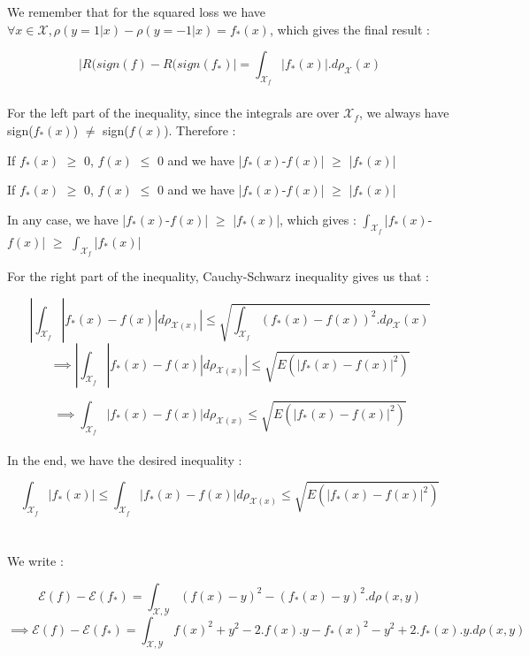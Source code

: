 \documentclass[final,3p,times,12pt]{article}
\begin{document}
We remember that for the squared loss we have $\forall x \in \mathcal{X}, \rho(y=1|x) - \rho(y=-1|x) = f_*(x)$, which gives the final result : 

\[
|R(sign(f) - R(sign(f_*)| = \int_{\mathcal{X}_f} |f_*(x)|. d\rho_{\mathcal{X}}(x)
\]

\subsubsection{}

For the left part of the inequality, since the integrals are over $\mathcal{X}_f$, we always have sign($f_*(x)$) $\neq$ sign($f(x)$). Therefore :

If $f_*(x)$ $\geq$ 0, $f(x)$ $\leq$ 0 and we have |$f_*(x)$-$f(x)$| $\geq$ |$f_*(x)$| 

If $f_*(x)$ $\geq$ 0, $f(x)$ $\leq$ 0 and we have |$f_*(x)$-$f(x)$| $\geq$ |$f_*(x)$| 

In any case, we have |$f_*(x)$-$f(x)$| $\geq$ |$f_*(x)$|, which gives : $\int_{\mathcal{X}_f}$|$f_*(x)$-$f(x)$| $\geq$ $\int_{\mathcal{X}_f}$|$f_*(x)$|


For the right part of the inequality, Cauchy-Schwarz inequality gives us that : 

\[
|\int_{\mathcal{X}_f}|f_*(x) - f(x)|d\rho_{\mathcal{X}(x)}| \leq \sqrt{\int_{\mathcal{X}_f} (f_*(x) - f(x))^2. d\rho_{\mathcal{X}}(x)}
\]
\[ \implies
|\int_{\mathcal{X}_f}|f_*(x) - f(x)|d\rho_{\mathcal{X}(x)}| \leq \sqrt{E(|f_*(x) - f(x)|^2)}
\]

\[ \implies
\int_{\mathcal{X}_f}|f_*(x) - f(x)|d\rho_{\mathcal{X}(x)} \leq \sqrt{E(|f_*(x) - f(x)|^2)}
\]\\

In the end, we have the desired inequality : 

\[ 
\int_{\mathcal{X}_f}|f_*(x)|\leq\int_{\mathcal{X}_f}|f_*(x) - f(x)|d\rho_{\mathcal{X}(x)} \leq \sqrt{E(|f_*(x) - f(x)|^2)}
\]\\



\subsubsection{}

We write : 

\[
\mathcal{E}(f) - \mathcal{E}(f_*) = \int_\mathcal{X,Y} (f(x)-y)^2 - (f_*(x)-y)^2 . d\rho(x,y)
\]
\[ \implies
\mathcal{E}(f) - \mathcal{E}(f_*) = \int_\mathcal{X,Y} f(x)^2 + y^2 - 2.f(x).y - f_*(x)^2 - y^2 + 2.f_*(x).y .  d\rho(x,y)
\]
\end{document}
